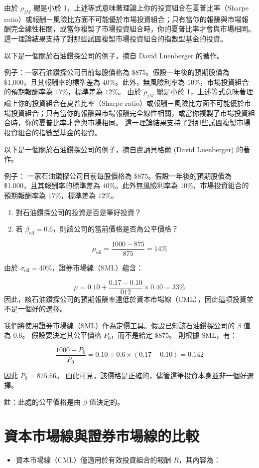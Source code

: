 \documentclass[letterpaper]{article}
\begin{document}
由於 $\rho_{j M}$ 總是小於 1，上述等式意味著理論上你的投資組合在夏普比率（Sharpe ratio）或報酬－風險比方面不可能優於市場投資組合；只有當你的報酬與市場報酬完全線性相關，或當你複製了市場投資組合時，你的夏普比率才會與市場相同。  
這一理論結果支持了對那些試圖複製市場投資組合的指數型基金的投資。

以下是一個關於石油鑽探公司的例子，摘自 David Luenberger 的著作。  

例子：一家石油鑽探公司目前每股價格為 \$875。假設一年後的預期股價為 \$1,000，且其報酬率的標準差為 $40\%$。此外，無風險利率為 $10\%$，市場投資組合的預期報酬率為 $17\%$，標準差為 $12\%$。
由於 $\rho_{j M}$ 總是小於 1，上述等式意味著理論上你的投資組合在夏普比率（Sharpe ratio）或報酬－風險比方面不可能優於市場投資組合；只有當你的報酬與市場報酬完全線性相關，或當你複製了市場投資組合時，你的夏普比率才會與市場相同。  
這一理論結果支持了對那些試圖複製市場投資組合的指數型基金的投資。

以下是一個關於石油鑽探公司的例子，摘自盧訥貝格爾 (David Luenberger) 的著作。  

例子： 一家石油鑽探公司目前每股價格為 \$875。假設一年後的預期股價為 \$1,000，且其報酬率的標準差為 $40\%$。此外無風險利率為 $10\%$，市場投資組合的預期報酬率為 $17\%$，標準差為 $12\%$。


\begin{enumerate}
	\item 對石油鑽探公司的投資是否是筆好投資？
	\item 若 $\beta_{\text{oil}}=0.6$，則該公司的當前價格是否為公平價格？
\end{enumerate}

$$
\mu_{\text{oil}}=\frac{1000-875}{875}=14\%
$$

由於 $\sigma_{\text{oil}}=40\%$，證券市場線（SML）蘊含：


$$
\mu=0.10+\frac{0.17-0.10}{012} \times 0.40=33 \%
$$
因此，該石油鑽探公司的預期報酬率遠低於資本市場線（CML），因此這項投資並不是一個好的選擇。

我們將使用證券市場線（SML）作為定價工具。假設已知該石油鑽探公司的 $\beta$ 值為 0.6。  
假設要決定其公平價格 $P_{0}$，而不是給定 $\$875$。  
則根據 SML，有：

$$
\frac{1000-P_{0}}{P_{0}} = 0.10 + 0.6 \times (0.17 - 0.10) = 0.142
$$

因此 $P_{0} = 875.66$。  
由此可見，該價格是正確的，儘管這筆投資本身並非一個好選擇。

註：此處的公平價格是由 $\beta$ 值決定的。

\section{資本市場線與證券市場線的比較}
\begin{itemize}
	\item 資本市場線（CML）僅適用於有效投資組合的報酬 $R$，其內容為：
\end{itemize}
\end{document}
